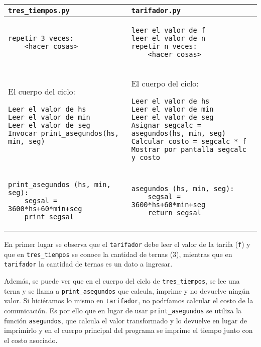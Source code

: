 \begin{solucion}
\begin{enumerate}
\begin{tabular}[l]{|p{6.8cm}|p{7.5cm}|}
\hline {\lstinline!tres_tiempos.py!} & \lstinline!tarifador.py!\\
\hline
\begin{verbatim}
repetir 3 veces:
    <hacer cosas>
\end{verbatim} 
&
\begin{verbatim}
leer el valor de f
leer el valor de n
repetir n veces:
    <hacer cosas>
\end{verbatim} 
\\
\hline
El cuerpo del ciclo:
{\footnotesize
\begin{verbatim}
Leer el valor de hs
Leer el valor de min
Leer el valor de seg
Invocar print_asegundos(hs, min, seg)


\end{verbatim} 
} &
El cuerpo del ciclo:
{\footnotesize
\begin{verbatim}
Leer el valor de hs
Leer el valor de min
Leer el valor de seg
Asignar segcalc = asegundos(hs, min, seg)
Calcular costo = segcalc * f
Mostrar por pantalla segcalc y costo
\end{verbatim} 
} \\
\hline
{\footnotesize
\begin{verbatim}
print_asegundos (hs, min, seg):
	segsal = 3600*hs+60*min+seg
	print segsal
\end{verbatim} 
} &
{\footnotesize
\begin{verbatim}
asegundos (hs, min, seg):
	segsal = 3600*hs+60*min+seg
	return segsal
\end{verbatim}
} \\
\hline
\end{tabular}


En primer lugar se observa que el \lstinline!tarifador! debe leer el valor de
la tarifa (\lstinline!f!) y que en \lstinline!tres_tiempos! se conoce la
cantidad de ternas (3), mientras que en \lstinline!tarifador! la cantidad
de ternas es un dato a ingresar.

Además, se puede ver que en el cuerpo del ciclo de
\lstinline!tres_tiempos!, se lee una terna y se llama a
\lstinline!print_asegundos! que calcula, imprime y no devuelve ningún
valor.  Si hiciéramos lo mismo en \lstinline!tarifador!, no podríamos
calcular el costo de la comunicación.  Es por ello que en lugar de usar
\lstinline!print_asegundos! se utiliza la función \lstinline!asegundos!,
que calcula el valor transformado y lo devuelve en lugar de imprimirlo y en
el cuerpo principal del programa se imprime el tiempo junto con el costo
asociado.


\end{enumerate}
\end{solucion}
